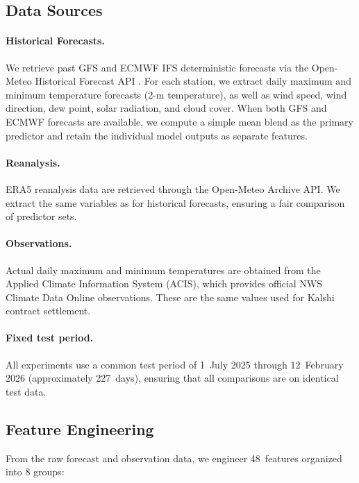 \documentclass[12pt, letterpaper]{article}
\begin{document}
\subsection{Data Sources}
\label{sec:data_sources}

\paragraph{Historical Forecasts.}
We retrieve past GFS and ECMWF IFS deterministic forecasts via the Open-Meteo
Historical Forecast API \citep{zippenfenig2023openmeteo}. For each station, we
extract daily maximum and minimum temperature forecasts (2-m temperature), as well
as wind speed, wind direction, dew point, solar radiation, and cloud cover. When
both GFS and ECMWF forecasts are available, we compute a simple mean blend as the
primary predictor and retain the individual model outputs as separate features.

\paragraph{Reanalysis.}
ERA5 reanalysis data \citep{hersbach2020era5} are retrieved through the Open-Meteo
Archive API. We extract the same variables as for historical forecasts, ensuring
a fair comparison of predictor sets.

\paragraph{Observations.}
Actual daily maximum and minimum temperatures are obtained from the Applied Climate
Information System (ACIS), which provides official NWS Climate Data Online
observations. These are the same values used for Kalshi contract settlement.

\paragraph{Fixed test period.}
All experiments use a common test period of 1~July 2025 through 12~February 2026
(approximately 227~days), ensuring that all comparisons are on identical test data.

\subsection{Feature Engineering}
\label{sec:features}

From the raw forecast and observation data, we engineer 48~features organized into
8 groups:
\end{document}
